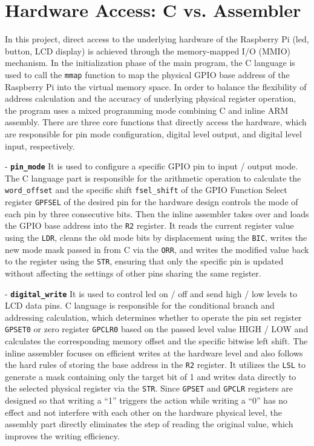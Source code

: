 \section{Hardware Access: C vs. Assembler}
\label{sec:hardware_access}

In this project, direct access to the underlying hardware of the Raspberry Pi (led, button, LCD display) is achieved through the memory-mapped I/O (MMIO) mechanism. In the initialization phase of the main program, the C language is used to call the \texttt{mmap} function to map the physical GPIO base address of the Raspberry Pi into the virtual memory space. In order to balance the flexibility of address calculation and the accuracy of underlying physical register operation, the program uses a mixed programming mode combining C and inline ARM assembly. There are three core functions that directly access the hardware, which are responsible for pin mode configuration, digital level output, and digital level input, respectively.

- \noindent \textbf{\texttt{pin\_mode}} It is used to configure a specific GPIO pin to input / output mode. The C language part is responsible for the arithmetic operation to calculate the \texttt{word\_offset} and the specific shift \texttt{fsel\_shift} of the GPIO Function Select register \texttt{GPFSEL} of the desired pin for the hardware design controls the mode of each pin by three consecutive bits. Then the inline assembler takes over and loads the GPIO base address into the \texttt{R2} register. It reads the current register value using the \texttt{LDR}, cleans the old mode bits by displacement using the \texttt{BIC}, writes the new mode mask passed in from C via the \texttt{ORR}, and writes the modified value back to the register using the \texttt{STR}, ensuring that only the specific pin is updated without affecting the settings of other pins sharing the same register.

- \noindent \textbf{\texttt{digital\_write}} It is used to control led on / off and send high / low levels to LCD data pins. C language is responsible for the conditional branch and addressing calculation, which determines whether to operate the pin set register \texttt{GPSET0} or zero register \texttt{GPCLR0} based on the passed level value HIGH / LOW and calculates the corresponding memory offset and the specific bitwise left shift. The inline assembler focuses on efficient writes at the hardware level and also follows the hard rules of storing the base address in the \texttt{R2} register. It utilizes the \texttt{LSL} to generate a mask containing only the target bit of 1 and writes data directly to the selected physical register via the \texttt{STR}. Since \texttt{GPSET} and \texttt{GPCLR} registers are designed so that writing a ``1'' triggers the action while writing a ``0'' has no effect and not interfere with each other on the hardware physical level, the assembly part directly eliminates the step of reading the original value, which improves the writing efficiency.

